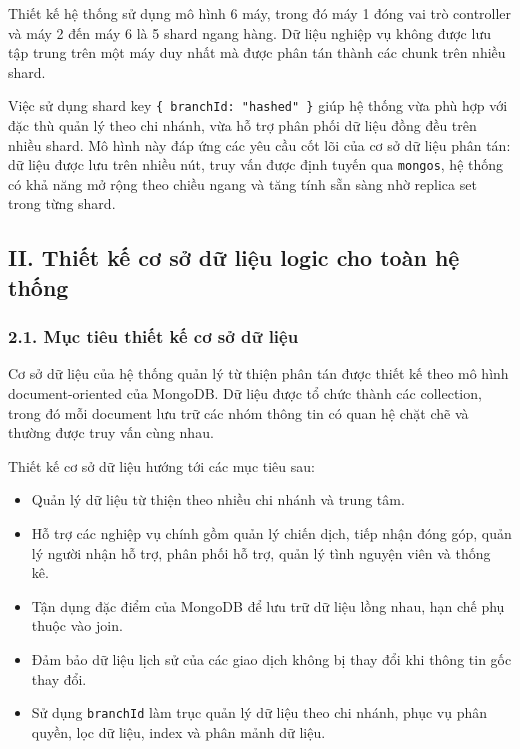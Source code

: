 \documentclass[12pt,a4paper]{article}
\begin{document}
Thiết kế hệ thống sử dụng mô hình 6 máy, trong đó máy 1 đóng vai trò controller và máy 2 đến máy 6 là 5 shard ngang hàng. Dữ liệu nghiệp vụ không được lưu tập trung trên một máy duy nhất mà được phân tán thành các chunk trên nhiều shard.

Việc sử dụng shard key \texttt{\{ branchId: "hashed" \}} giúp hệ thống vừa phù hợp với đặc thù quản lý theo chi nhánh, vừa hỗ trợ phân phối dữ liệu đồng đều trên nhiều shard. Mô hình này đáp ứng các yêu cầu cốt lõi của cơ sở dữ liệu phân tán: dữ liệu được lưu trên nhiều nút, truy vấn được định tuyến qua \texttt{mongos}, hệ thống có khả năng mở rộng theo chiều ngang và tăng tính sẵn sàng nhờ replica set trong từng shard.



\subsection*{II. Thiết kế cơ sở dữ liệu logic cho toàn hệ thống}

\subsubsection*{2.1. Mục tiêu thiết kế cơ sở dữ liệu}

Cơ sở dữ liệu của hệ thống quản lý từ thiện phân tán được thiết kế theo mô hình document-oriented của MongoDB. Dữ liệu được tổ chức thành các collection, trong đó mỗi document lưu trữ các nhóm thông tin có quan hệ chặt chẽ và thường được truy vấn cùng nhau.

Thiết kế cơ sở dữ liệu hướng tới các mục tiêu sau:

\begin{itemize}
    \item Quản lý dữ liệu từ thiện theo nhiều chi nhánh và trung tâm.
    \item Hỗ trợ các nghiệp vụ chính gồm quản lý chiến dịch, tiếp nhận đóng góp, quản lý người nhận hỗ trợ, phân phối hỗ trợ, quản lý tình nguyện viên và thống kê.
    \item Tận dụng đặc điểm của MongoDB để lưu trữ dữ liệu lồng nhau, hạn chế phụ thuộc vào join.
    \item Đảm bảo dữ liệu lịch sử của các giao dịch không bị thay đổi khi thông tin gốc thay đổi.
    \item Sử dụng \texttt{branchId} làm trục quản lý dữ liệu theo chi nhánh, phục vụ phân quyền, lọc dữ liệu, index và phân mảnh dữ liệu.
\end{itemize}
\end{document}
